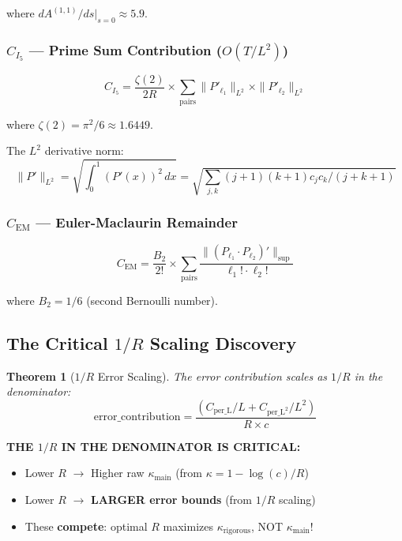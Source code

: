 \documentclass[11pt]{article}
\newtheorem{theorem}{Theorem}
\begin{document}
where $dA^{(1,1)}/ds|_{s=0} \approx 5.9$.

\subsubsection{$C_{I_5}$ --- Prime Sum Contribution ($O(T/L^2)$)}

\begin{equation}
C_{I_5} = \frac{\zeta(2)}{2R} \times \sum_{\text{pairs}} \|P'_{\ell_1}\|_{L^2} \times \|P'_{\ell_2}\|_{L^2}
\end{equation}

where $\zeta(2) = \pi^2/6 \approx 1.6449$.

The $L^2$ derivative norm:
\begin{equation}
\|P'\|_{L^2} = \sqrt{\int_0^1 (P'(x))^2 \, dx} = \sqrt{\sum_{j,k} (j+1)(k+1) c_j c_k / (j+k+1)}
\end{equation}

\subsubsection{$C_{\text{EM}}$ --- Euler-Maclaurin Remainder}

\begin{equation}
C_{\text{EM}} = \frac{B_2}{2!} \times \sum_{\text{pairs}} \frac{\|(P_{\ell_1} \cdot P_{\ell_2})'\|_{\sup}}{\ell_1! \cdot \ell_2!}
\end{equation}

where $B_2 = 1/6$ (second Bernoulli number).

\subsection{The Critical $1/R$ Scaling Discovery}

\begin{theorem}[$1/R$ Error Scaling]
The error contribution scales as $1/R$ in the denominator:
\begin{equation}
\boxed{
\text{error\_contribution} = \frac{(C_{\text{per\_L}}/L + C_{\text{per\_L}^2}/L^2)}{R \times c}
}
\end{equation}
\end{theorem}

\textbf{THE $1/R$ IN THE DENOMINATOR IS CRITICAL:}
\begin{itemize}
\item Lower $R$ $\to$ Higher raw $\kappa_{\text{main}}$ (from $\kappa = 1 - \log(c)/R$)
\item Lower $R$ $\to$ \textbf{LARGER error bounds} (from $1/R$ scaling)
\item These \textbf{compete}: optimal $R$ maximizes $\kappa_{\text{rigorous}}$, NOT $\kappa_{\text{main}}$!
\end{itemize}
\end{document}
